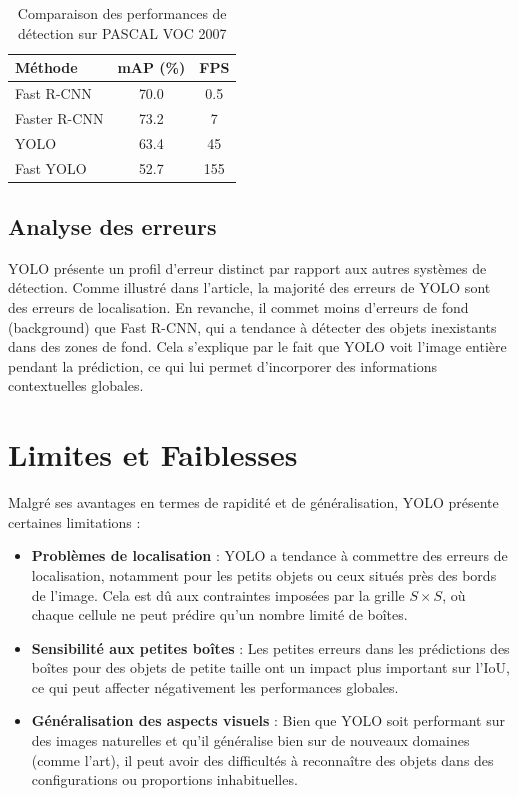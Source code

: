 \documentclass[a4paper,11pt]{article}
\begin{document}
\begin{table}[h]
\centering
\begin{tabular}{|l|c|c|}
\hline
\textbf{Méthode} & \textbf{mAP (\%)} & \textbf{FPS} \\
\hline
Fast R-CNN & 70.0 & 0.5 \\
Faster R-CNN & 73.2 & 7 \\
YOLO & 63.4 & 45 \\
Fast YOLO & 52.7 & 155 \\
\hline
\end{tabular}
\caption{Comparaison des performances de détection sur PASCAL VOC 2007}
\label{tab:performance}
\end{table}

\subsection{Analyse des erreurs}
YOLO présente un profil d'erreur distinct par rapport aux autres systèmes de détection. Comme illustré dans l'article, la majorité des erreurs de YOLO sont des erreurs de localisation. En revanche, il commet moins d'erreurs de fond (background) que Fast R-CNN, qui a tendance à détecter des objets inexistants dans des zones de fond. Cela s'explique par le fait que YOLO voit l'image entière pendant la prédiction, ce qui lui permet d'incorporer des informations contextuelles globales.

\section{Limites et Faiblesses}
Malgré ses avantages en termes de rapidité et de généralisation, YOLO présente certaines limitations :
\begin{itemize}
    \item \textbf{Problèmes de localisation} : YOLO a tendance à commettre des erreurs de localisation, notamment pour les petits objets ou ceux situés près des bords de l'image. Cela est dû aux contraintes imposées par la grille $S \times S$, où chaque cellule ne peut prédire qu'un nombre limité de boîtes.
    \item \textbf{Sensibilité aux petites boîtes} : Les petites erreurs dans les prédictions des boîtes pour des objets de petite taille ont un impact plus important sur l'IoU, ce qui peut affecter négativement les performances globales.
    \item \textbf{Généralisation des aspects visuels} : Bien que YOLO soit performant sur des images naturelles et qu'il généralise bien sur de nouveaux domaines (comme l'art), il peut avoir des difficultés à reconnaître des objets dans des configurations ou proportions inhabituelles.
\end{itemize}
\end{document}
